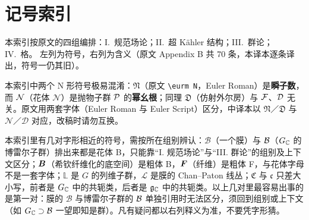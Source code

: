 
\section{记号索引}
\label{sec:B}

本索引按原文的四组编排：I.\ 规范场论；II.\ 超 K\"ahler 结构；III.\ 群论；IV.\ 格。
左列为符号，右列为含义（原文 Appendix B 共 70 条，本译本逐条译出，符号一仍其旧）。

\begin{yizhu}
本索引中两个 $\mathrm{N}$ 形符号极易混淆：${\mathfrak N}$（原文 \verb|\eurm N|，Euler Roman）是\textbf{瞬子数}，
而 $\mathcal{N}$（花体 $\mathcal N$）是抛物子群 $\mathcal{P}$ 的\textbf{幂幺根}；同理 ${\mathfrak D}$（仿射外尔房）与
${\mathcal F}$、${\mathcal D}$ 无关。原文用两套字体（Euler Roman 与 Euler Script）区分，中译本以
$\mathfrak{N}$／$\mathfrak{D}$ 与 $\mathcal{N}$／$\mathcal{D}$ 对应，改稿时请勿互换。
\end{yizhu}

\begin{yizhu}[易错点]
本索引里有几对字形相近的符号，需按所在组别辨认：${\mathcal B}$（一个膜）与 $\mathcal{B}$（$G_{\mathbb{C}}$ 的博雷尔子群）排出来都是花体 B，只能靠“I. 规范场论”与“III. 群论”的组别及上下文区分；$\bm{B}$（希钦纤维化的底空间）是粗体 B，${\bm{F}}$（纤维）是粗体 F，与花体字母不是一套字体；$\mathbb{L}$ 是 $G$ 的列维子群，${\mathcal L}$ 是膜的 Chan--Paton 线丛；$\mathfrak C$ 与 $\mathfrak c$ 只差大小写，前者是 $G_{\mathbb{C}}$ 中的共轭类，后者是 $\mathfrak g_{\mathbb{C}}$ 中的共轭类。以上几对里最容易出事的是第一对：膜的 ${\mathcal B}$ 与博雷尔子群的 $\mathcal{B}$ 单独引用时无法区分，须回到组别或上下文（如 $G_{\mathbb{C}}\supset\mathcal{B}$ 一望即知是群）。凡有疑问都以右列释义为准，不要凭字形猜。
\end{yizhu}

